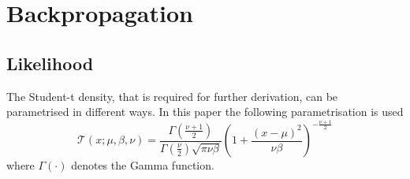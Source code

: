 \documentclass[letterpaper]{article}
\begin{document}
\section{Backpropagation}
\label{sec:backpropagation}
\subsection{Likelihood}
The Student-t density, that is required for further derivation, can be parametrised in different ways. In this paper the following parametrisation is used 
\begin{equation}
\mathcal{T}(x; \mu, \beta, \nu) = \frac{\Gamma\left(\frac{\nu + 1}{2}\right)}{\Gamma\left(\frac{\nu}{2}\right)\sqrt{\pi \nu \beta}} \left(1 + \frac{(x - \mu)^2}{\nu\beta}\right)^{-\frac{\nu + 1}{2}}
\end{equation}
where $\Gamma(\cdot)$ denotes the Gamma function.
\end{document}
